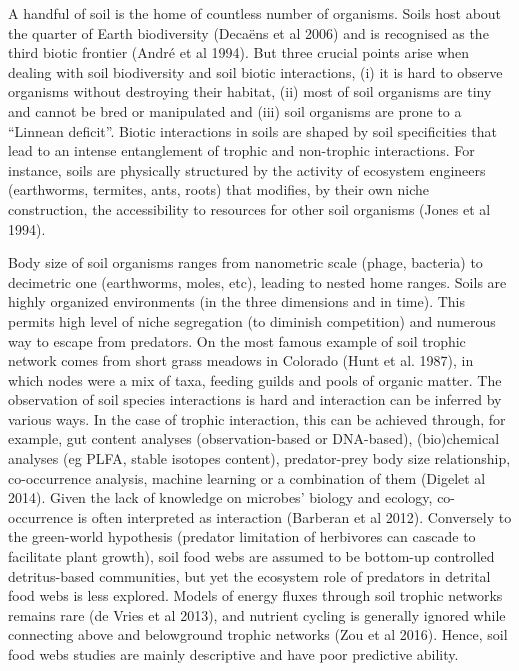 A handful of soil is the home of countless number of organisms. Soils host about
the quarter of Earth biodiversity (Decaëns et al 2006) and is recognised as the
third biotic frontier (André et al 1994). But three crucial points arise when
dealing with soil biodiversity and soil biotic interactions, (i) it is hard to
observe organisms without destroying their habitat, (ii) most of soil organisms
are tiny and cannot be bred or manipulated and (iii) soil organisms are prone to
a “Linnean deficit”. Biotic interactions in soils are shaped by soil
specificities that lead to an intense entanglement of trophic and non-trophic
interactions. For instance, soils are physically structured by the activity of
ecosystem engineers (earthworms, termites, ants, roots) that modifies, by their
own niche construction, the accessibility to resources for other soil organisms
(Jones et al 1994).

Body size of soil organisms ranges from nanometric scale (phage, bacteria) to
decimetric one (earthworms, moles, etc), leading to nested home ranges. Soils
are highly organized environments (in the three dimensions and in time). This
permits high level of niche segregation (to diminish competition) and numerous
way to escape from predators. On the most famous example of soil trophic network
comes from short grass meadows in Colorado (Hunt et al. 1987), in which nodes
were a mix of taxa, feeding guilds and pools of organic matter. The observation
of soil species interactions is hard and interaction can be inferred by various
ways. In the case of trophic interaction, this can be achieved through, for
example, gut content analyses (observation-based or DNA-based), (bio)chemical
analyses (eg PLFA, stable isotopes content), predator-prey body size
relationship, co-occurrence analysis, machine learning or a combination of them
(Digelet al 2014). Given the lack of knowledge on microbes’ biology and ecology,
co-occurrence is often interpreted as interaction (Barberan et al 2012).
Conversely to the green-world hypothesis (predator limitation of herbivores can
cascade to facilitate plant growth), soil food webs are assumed to be bottom-up
controlled detritus-based communities, but yet the ecosystem role of predators
in detrital food webs is less explored. Models of energy fluxes through soil
trophic networks remains rare (de Vries et al 2013), and nutrient cycling is
generally ignored while connecting above and belowground trophic networks (Zou
et al 2016). Hence, soil food webs studies are mainly descriptive and have poor
predictive ability.


